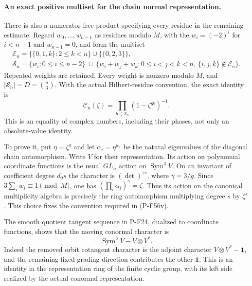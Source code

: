 \paragraph{An exact positive multiset for the chain normal representation.}
There is also a numerator-free product specifying every residue
in the remaining estimate. Regard
$w_0,\ldots,w_{n-1}$ as residues modulo $M$, with the
$w_i=(-2)^i$ for $i<n-1$ and $w_{n-1}=0$, and form the multiset
\[
 \begin{gathered}
 \mathcal E_n=
 \{\{0,1,k\}:2\le k<n\}\cup\{\{0,2,3\}\},\\
 \mathcal S_n=\{w_i:0\le i\le n-2\}\ \sqcup\
 \{w_i+w_j+w_k:0\le i<j<k<n,\
       \{i,j,k\}\notin\mathcal E_n\}.
 \end{gathered}
 \tag{P-F56u}
\]
Repeated weights are retained. Every weight is nonzero modulo
$M$, and $|\mathcal S_n|=D=\binom n3$.
With the actual Hilbert-residue convention, the exact identity is
\[
 \mathcal C_n(\zeta)=
                 \prod_{b\in\mathcal S_n}(1-\zeta^{gb})^{-1}.
 \tag{P-F56v}
\]
This is an equality of complex numbers, including their phases,
not only an absolute-value identity.

To prove it, put $\eta=\zeta^g$ and let
$\alpha_i=\eta^{w_i}$ be the natural eigenvalues of the diagonal
chain automorphism. Write $V$ for their representation.
Its action on polynomial coordinate functions is the usual
$GL_n$ action on $\operatorname{Sym}^3 V$.
On an invariant of coefficient degree $d_0s$ the character is
$(\det)^{\gamma s}$, where $\gamma=3/g$.
Since $3\sum_i w_i\equiv1\pmod M$, one has
$(\prod_i\alpha_i)^\gamma=\zeta$.
Thus its action on the canonical multiplicity algebra is precisely
the ring automorphism multiplying degree $s$ by $\zeta^s$.
This choice fixes the convention required in (P-F56v).

The smooth quotient tangent sequence in P-F24, dualized to
coordinate functions, shows that the moving conormal character is
\[
 \operatorname{Sym}^3 V-V\otimes V^*.
 \tag{P-F56w}
\]
Indeed the removed orbit cotangent character is the adjoint
character $V\otimes V^*-\mathbf1$, and the remaining fixed
grading direction contributes the other $\mathbf1$.
This is an identity in the representation ring of the finite
cyclic group, with its left side realized by the actual
conormal representation.

